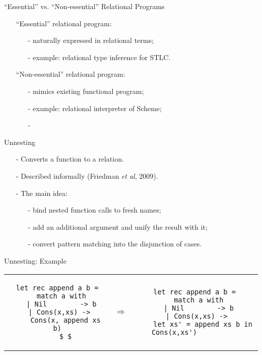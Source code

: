 \documentclass{beamer}
\theoremstyle{definition}
\begin{document}
\begin{frame}[fragile]{``Essential'' vs. ``Non-essential'' Relational Programs}
\begin{itemize}
    \item[] ``Essential'' relational program:
    \begin{itemize}
        \item[-] naturally expressed in relational terms;
        \item[-] example: relational type inference for STLC.
    \end{itemize} 
    \pause \vskip5mm
    \item[] ``Non-essential'' relational program:
    \begin{enumerate}
        \item[-] mimics existing functional program;
        \item[-] example: relational interpreter of Scheme;
        \pause        
        \item[-] \color{green}{can be automated.}
    \end{enumerate}
\end{itemize}
\end{frame}

\begin{frame}[fragile]{Unnesting}
\begin{itemize}
    \item[-] Converts a function to a relation.
    \item[-] Described informally (Friedman \emph{et al}, 2009).
    \pause\vskip5mm
    \item[-] The main idea:
    \begin{itemize}
        \item[-] bind nested function calls to fresh names;
        \item[-] add an additional argument and unify the result with it;
        \item[-] convert pattern matching into the disjunction of cases.
    \end{itemize}
\end{itemize}
\end{frame}

\begin{frame}[fragile]{Unnesting: Example}
  \begin{tabular}{ccc}
    \begin{lstlisting}
let rec append a b =
  match a with
  | Nil        -> b
  | Cons(x,xs) -> 
    Cons(x, append xs b)
    $ $
    \end{lstlisting} & 
    $\Rightarrow$ &
    \begin{lstlisting}
let rec append a b =
  match a with
  | Nil        -> b
  | Cons(x,xs) -> 
    let xs' = append xs b in
    Cons(x,xs')              
    \end{lstlisting}
  \end{tabular}
\end{frame}
\end{document}
